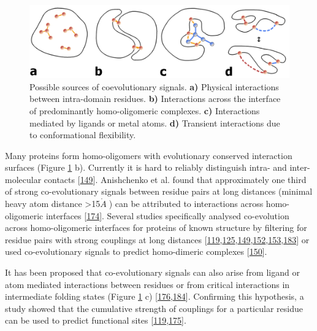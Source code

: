 \documentclass[11pt,a4paper,twoside]{book}
\newcommand{\angstrom}{\mathring{A} \;}
\theoremstyle{definition}
\theoremstyle{definition}
\theoremstyle{remark}
\begin{document}
\begin{figure}

{\centering \includegraphics[width=0.9\linewidth]{img/intro/sources_of_coevolution} 

}

\caption{Possible sources of coevolutionary
signals. \textbf{a)} Physical interactions between intra-domain
residues. \textbf{b)} Interactions across the interface of predominantly
homo-oligomeric complexes. \textbf{c)} Interactions mediated by ligands
or metal atoms. \textbf{d)} Transient interactions due to conformational
flexibility.}\label{fig:sources-coevolution}
\end{figure}

Many proteins form homo-oligomers with evolutionary conserved
interaction surfaces (Figure \ref{fig:sources-coevolution} b). Currently
it is hard to reliably distinguish intra- and inter-molecular contacts
{[}\protect\hyperlink{ref-Uguzzoni2017}{149}{]}. Anishchenko et al.
found that approximately one third of strong co-evolutionary signals
between residue pairs at long distances (minimal heavy atom distance
\textgreater{}15\(\angstrom\)) can be attributed to interactions across
homo-oligomeric interfaces
{[}\protect\hyperlink{ref-Anishchenko2017}{174}{]}. Several studies
specifically analysed co-evolution across homo-oligomeric interfaces for
proteins of known structure by filtering for residue pairs with strong
couplings at long distances
{[}\protect\hyperlink{ref-Hopf2012}{119},\protect\hyperlink{ref-Wang2015}{125},\protect\hyperlink{ref-Uguzzoni2017}{149},\protect\hyperlink{ref-Sutto2015}{152},\protect\hyperlink{ref-Jana2014}{153},\protect\hyperlink{ref-Lee2009}{183}{]}
or used co-evolutionary signals to predict homo-dimeric complexes
{[}\protect\hyperlink{ref-DosSantos2015a}{150}{]}.

It has been proposed that co-evolutionary signals can also arise from
ligand or atom mediated interactions between residues or from critical
interactions in intermediate folding states (Figure
\ref{fig:sources-coevolution} c)
{[}\protect\hyperlink{ref-Buslje2009}{176},\protect\hyperlink{ref-Ovchinnikov2015b}{184}{]}.
Confirming this hypothesis, a study showed that the cumulative strength
of couplings for a particular residue can be used to predict functional
sites
{[}\protect\hyperlink{ref-Hopf2012}{119},\protect\hyperlink{ref-Marks2012}{175}{]}.
\end{document}
